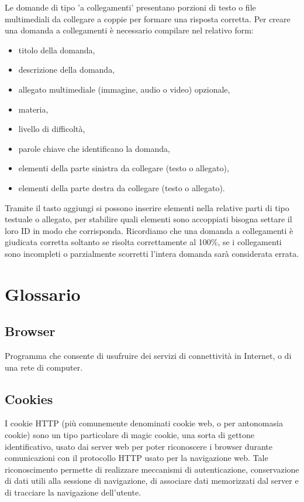 \documentclass[a4paper, titlepage]{article}
\begin{document}
	 Le domande di tipo 'a collegamenti' presentano porzioni di testo o file multimediali da collegare a coppie per formare una risposta corretta.
	 Per creare una domanda a collegamenti è necessario compilare nel relativo form:
	 \begin{itemize}
	 	\item titolo della domanda,
	 	\item descrizione della domanda,
	 	\item allegato multimediale (immagine, audio o video) opzionale,
	 	\item materia,
	 	\item livello di difficoltà,
	 	\item parole chiave che identificano la domanda,
	 	\item elementi della parte sinistra da collegare (testo o allegato),
	 	\item elementi della parte destra da collegare (testo o allegato).
	 \end{itemize}
	 Tramite il tasto aggiungi si possono inserire elementi nella relative parti di tipo testuale o allegato, per stabilire quali elementi sono accoppiati bisogna settare il loro ID in modo che corrisponda. Ricordiamo che una domanda a collegamenti è giudicata corretta soltanto se risolta correttamente al 100\%, se i collegamenti sono incompleti o parzialmente scorretti l'intera domanda sarà considerata errata.
	 
	 \section{Glossario}
	 \label{gl} 
	 
	 \subsection{Browser}
	 Programma che consente di usufruire dei servizi di connettività in Internet, o di una rete di computer.
	 
	 \subsection{Cookies}
	 I cookie HTTP (più comunemente denominati cookie web, o per antonomasia cookie) sono un tipo
	 particolare di magic cookie, una sorta di gettone identificativo, usato dai server web per poter
	 riconoscere i browser durante comunicazioni con il protocollo HTTP usato per la navigazione web.
	 Tale riconoscimento permette di realizzare meccanismi di autenticazione, conservazione di dati utili
	 alla sessione di navigazione, di associare dati memorizzati dal server e di tracciare la navigazione dell’utente.
	 
\end{document}
